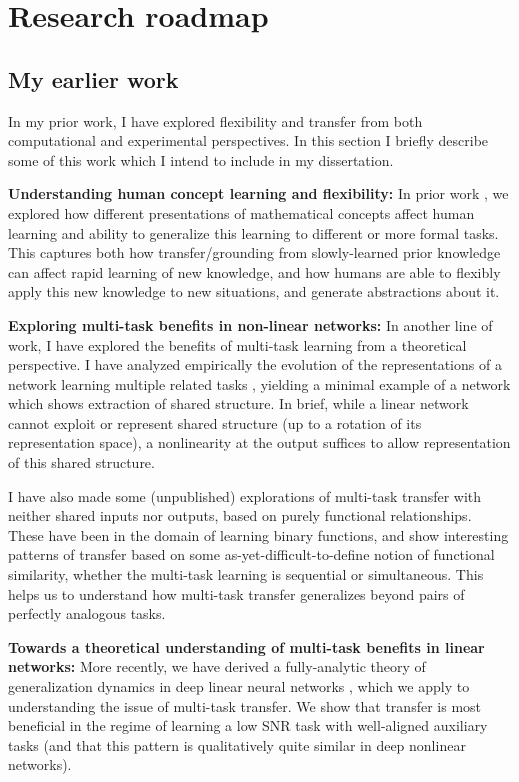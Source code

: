\documentclass[11pt]{article}
\begin{document}
\section{Research roadmap}

\subsection{My earlier work}
In my prior work, I have explored flexibility and transfer from both computational and experimental perspectives. In this section I briefly describe some of this work which I intend to include in my dissertation. \par

\textbf{Understanding human concept learning and flexibility:} In prior work \citep{Lampinen2017b}, we explored how different presentations of mathematical concepts affect human learning and ability to generalize this learning to different or more formal tasks. This captures both how transfer/grounding from slowly-learned prior knowledge can affect rapid learning of new knowledge, and how humans are able to flexibly apply this new knowledge to new situations, and generate abstractions about it. \par 
\textbf{Exploring multi-task benefits in non-linear networks:} In another line of work, I have explored the benefits of multi-task learning from a theoretical perspective. I have analyzed empirically the evolution of the representations of a network learning multiple related tasks \citep{Lampinen2017a}, yielding a minimal example of a network which shows extraction of shared structure. In brief, while a linear network cannot exploit or represent shared structure (up to a rotation of its representation space), a nonlinearity at the output suffices to allow representation of this shared structure. \par
I have also made some (unpublished) explorations of multi-task transfer with neither shared inputs nor outputs, based on purely functional relationships. These have been in the domain of learning binary functions, and show interesting patterns of transfer based on some as-yet-difficult-to-define notion of functional similarity, whether the multi-task learning is sequential or simultaneous. This helps us to understand how multi-task transfer generalizes beyond pairs of perfectly analogous tasks. \par
\textbf{Towards a theoretical understanding of multi-task benefits in linear networks:} More recently, we have derived a fully-analytic theory of generalization dynamics in deep linear neural networks \citep{Lampinen2019}, which we apply to understanding the issue of multi-task transfer. We show that transfer is most beneficial in the regime of learning a low SNR task with well-aligned auxiliary tasks (and that this pattern is qualitatively quite similar in deep nonlinear networks). \par 
\end{document}
